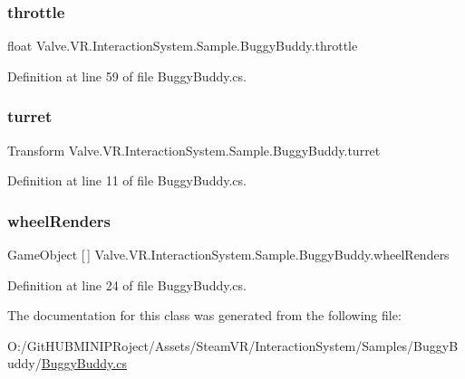 \subsubsection{\texorpdfstring{throttle}{throttle}}
{\footnotesize\ttfamily float Valve.\+V\+R.\+Interaction\+System.\+Sample.\+Buggy\+Buddy.\+throttle}



Definition at line 59 of file Buggy\+Buddy.\+cs.

\mbox{\label{class_valve_1_1_v_r_1_1_interaction_system_1_1_sample_1_1_buggy_buddy_a881f60e607236680ef5e034ddbf0e332}} 
\subsubsection{\texorpdfstring{turret}{turret}}
{\footnotesize\ttfamily Transform Valve.\+V\+R.\+Interaction\+System.\+Sample.\+Buggy\+Buddy.\+turret}



Definition at line 11 of file Buggy\+Buddy.\+cs.

\mbox{\label{class_valve_1_1_v_r_1_1_interaction_system_1_1_sample_1_1_buggy_buddy_aaf27c7f2414970c0a33443c29ca614cc}} 
\subsubsection{\texorpdfstring{wheelRenders}{wheelRenders}}
{\footnotesize\ttfamily Game\+Object \mbox{[}$\,$\mbox{]} Valve.\+V\+R.\+Interaction\+System.\+Sample.\+Buggy\+Buddy.\+wheel\+Renders}



Definition at line 24 of file Buggy\+Buddy.\+cs.



The documentation for this class was generated from the following file\+:\begin{DoxyCompactItemize}
\item 
O\+:/\+Git\+H\+U\+B\+M\+I\+N\+I\+P\+Roject/\+Assets/\+Steam\+V\+R/\+Interaction\+System/\+Samples/\+Buggy\+Buddy/\mbox{\hyperlink{_buggy_buddy_8cs}{Buggy\+Buddy.\+cs}}\end{DoxyCompactItemize}
